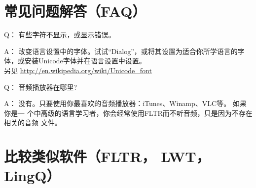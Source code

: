 \documentclass[cn,10pt,math=newtx,citestyle=gb7714-2015,bibstyle=gb7714-2015]{elegantbook}
\begin{document}
\chapter{常见问题解答（FAQ）}\label{常见问题解答（FAQ）}
Q：
有些字符不显示，或显示错误。

A：
改变语言设置中的字体。试试“Dialog”，或将其设置为适合你所学语言的字体，或安装Unicode字体并在语言设置中设置。\\
另见 \url{http://en.wikipedia.org/wiki/Unicode_font}

Q：
音频播放器在哪里?

A：
没有。只要使用你最喜欢的音频播放器：iTunes、Winamp、VLC等。 如果你是一
个中高级的语言学习者，你会经常使用FLTR而不听音频，只是因为不存在相关的音频
文件。

\chapter{比较类似软件（FLTR， LWT， LingQ）}
\label{比较类似软件（FLTR， LWT， LingQ）}
\renewcommand{\arraystretch}{1.3}%
\end{document}
